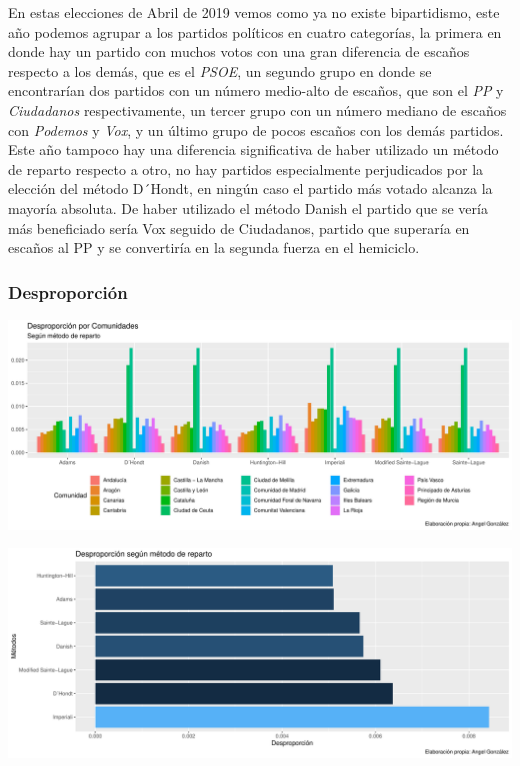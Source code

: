 \documentclass[12pt,a4paper,]{book}
\numberwithin{dummy}{section}
\theoremstyle{ocrenumbox}
\theoremstyle{blacknumex}
\theoremstyle{blacknumbox}
\theoremstyle{ocrenum}
\theoremstyle{ocrenum}
\begin{document}
En estas elecciones de Abril de 2019 vemos como ya no existe
bipartidismo, este año podemos agrupar a los partidos políticos en
cuatro categorías, la primera en donde hay un partido con muchos votos
con una gran diferencia de escaños respecto a los demás, que es el
\emph{PSOE}, un segundo grupo en donde se encontrarían dos partidos con
un número medio-alto de escaños, que son el \emph{PP} y
\emph{Ciudadanos} respectivamente, un tercer grupo con un número mediano
de escaños con \emph{Podemos} y \emph{Vox}, y un último grupo de pocos
escaños con los demás partidos. Este año tampoco hay una diferencia
significativa de haber utilizado un método de reparto respecto a otro,
no hay partidos especialmente perjudicados por la elección del método
D´Hondt, en ningún caso el partido más votado alcanza la mayoría
absoluta. De haber utilizado el método Danish el partido que se vería
más beneficiado sería Vox seguido de Ciudadanos, partido que superaría
en escaños al PP y se convertiría en la segunda fuerza en el hemiciclo.

\hypertarget{desproporciuxf3n-13}{%
\subsubsection{Desproporción}\label{desproporciuxf3n-13}}

\begin{center}\includegraphics[width=0.95\linewidth]{figurasR/unnamed-chunk-129-1} \end{center}

\begin{center}\includegraphics[width=0.95\linewidth]{figurasR/unnamed-chunk-129-2} \end{center}
\end{document}
